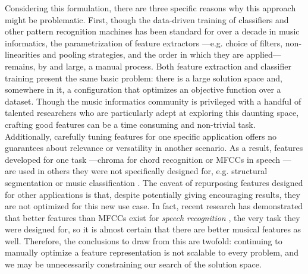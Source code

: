 Considering this formulation, there are three specific reasons why this approach might be problematic.
First, though the data-driven training of classifiers and other pattern recognition machines has been standard for over a decade in music informatics, the parametrization of feature extractors ---e.g. choice of filters, non-linearities and pooling strategies, and the order in which they are applied--- remains, by and large, a manual process.
Both feature extraction and classifier training present the same basic problem: there is a large solution space and, somewhere in it, a configuration that optimizes an objective function over a dataset.
Though the music informatics community is privileged with a handful of talented researchers who are particularly adept at exploring this daunting space, crafting good features can be a time consuming and non-trivial task.
Additionally, carefully tuning features for one specific application offers no guarantees about relevance or versatility in another scenario.
As a result, features developed for one task ---chroma for chord recognition \cite{Fujishima1999} or MFCCs in speech \cite{Mermelstein1980}--- are used in others they were not specifically designed for, e.g. structural segmentation \cite{Levy2007} or music classification \cite{Mandel2005}.
The caveat of repurposing features designed for other applications is that, despite potentially giving encouraging results, they are not optimized for this new use case.
In fact, recent research has demonstrated that better features than MFCCs exist for \emph{speech recognition} \cite{Hinton2012}, the very task they were designed for, so it is almost certain that there are better musical features as well.
Therefore, the conclusions to draw from this are twofold: continuing to manually optimize a feature representation is not scalable to every problem, and we may be unnecessarily constraining our search of the solution space.


